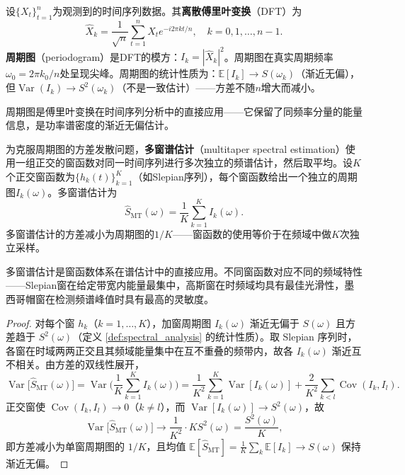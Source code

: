 \begin{definition}[时间序列的频谱分析]\label{def:spectral_analysis}
设$\{X_t\}_{t=1}^{n}$为观测到的时间序列数据。其\textbf{离散傅里叶变换}（DFT）为
\[
\hat{X}_k = \frac{1}{\sqrt{n}} \sum_{t=1}^{n} X_t e^{-i 2\pi k t / n}, \quad k = 0, 1, \dots, n-1.
\]
\textbf{周期图}（periodogram）是DFT的模方：$I_k = |\hat{X}_k|^2$。周期图在真实周期频率$\omega_0 = 2\pi k_0/n$处呈现尖峰。周期图的统计性质为：$\mathbb{E}[I_k] \to S(\omega_k)$（渐近无偏），但$\operatorname{Var}(I_k) \to S^2(\omega_k)$（不是一致估计）——方差不随$n$增大而减小。

周期图是傅里叶变换在时间序列分析中的直接应用——它保留了同频率分量的能量信息，是功率谱密度的渐近无偏估计。
\end{definition}

\begin{proposition}[多窗谱估计]\label{prop:multitaper}
为克服周期图的方差发散问题，\textbf{多窗谱估计}（multitaper spectral estimation）使用一组正交的窗函数对同一时间序列进行多次独立的频谱估计，然后取平均。设$K$个正交窗函数为$\{h_k(t)\}_{k=1}^{K}$（如Slepian序列），每个窗函数给出一个独立的周期图$I_k(\omega)$。多窗谱估计为
\[
\hat{S}_{\text{MT}}(\omega) = \frac{1}{K} \sum_{k=1}^{K} I_k(\omega).
\]
多窗谱估计的方差减小为周期图的$1/K$——窗函数的使用等价于在频域中做$K$次独立采样。

多窗谱估计是窗函数体系在谱估计中的直接应用。不同窗函数对应不同的频域特性——Slepian窗在给定带宽内能量最集中，高斯窗在时频域均具有最佳光滑性，墨西哥帽窗在检测频谱峰值时具有最高的灵敏度。
\end{proposition}

\begin{proof}
对每个窗 $h_k$（$k = 1,\dots,K$），加窗周期图 $I_k(\omega)$ 渐近无偏于 $S(\omega)$ 且方差趋于 $S^2(\omega)$（定义 \ref{def:spectral_analysis} 的统计性质）。取 Slepian 序列时，各窗在时域两两正交且其频域能量集中在互不重叠的频带内，故各 $I_k(\omega)$ 渐近互不相关。由方差的双线性展开，
\[
\operatorname{Var}\big[\hat{S}_{\text{MT}}(\omega)\big]
= \operatorname{Var}\Big( \frac{1}{K}\sum_{k=1}^{K} I_k(\omega) \Big)
= \frac{1}{K^2}\sum_{k=1}^{K} \operatorname{Var}[I_k(\omega)] + \frac{2}{K^2}\sum_{k<l} \operatorname{Cov}(I_k, I_l).
\]
正交窗使 $\operatorname{Cov}(I_k, I_l) \to 0$（$k \neq l$），而 $\operatorname{Var}[I_k(\omega)] \to S^2(\omega)$，故
\[
\operatorname{Var}\big[\hat{S}_{\text{MT}}(\omega)\big] \to \frac{1}{K^2}\cdot K S^2(\omega) = \frac{S^2(\omega)}{K},
\]
即方差减小为单窗周期图的 $1/K$，且均值 $\mathbb{E}[\hat{S}_{\text{MT}}] = \frac{1}{K}\sum_k \mathbb{E}[I_k] \to S(\omega)$ 保持渐近无偏。
\end{proof}

